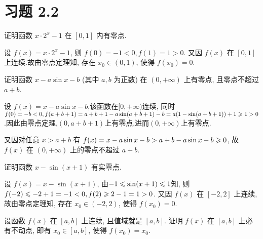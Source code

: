 \section{习题 2.2}

\begin{exercise}[2.2.1]
    证明函数 $x \cdot 2^x - 1$ 在 $[0,1]$ 内有零点.
\end{exercise}

\begin{solution}
    设 $f(x) = x \cdot 2^x - 1$, 则 $f(0) = -1 < 0, f(1) = 1 > 0$. 又因 $f(x)$ 在 $[0,1]$ 上连续.故由零点定理知, 存在 $x_0 \in (0,1)$, 使得 $f(x_0) = 0$.
\end{solution}

\begin{exercise}[2.2.2]
    证明函数 $x - a\sin x - b$ (其中 $a,b$ 为正数) 在 $(0, +\infty)$ 上有零点, 且零点不超过 $a+b$.
\end{exercise}

\begin{solution}
    设 $f(x) = x - a\sin x - b$,该函数在$[0,+\infty)$连续, 同时 $f(0) = -b < 0, f(a+b+1) = a + b + 1 - a\sin(a+b+1) - b = a(1-\sin(a+b+1))+1 \geqslant 1>0$.因此由零点定理,$(0,a+b+1)$上有零点,进而$(0,+\infty)$上有零点.

    又因对任意 $x > a+b$ 有 $f(x) = x - a\sin x - b > a + b - a \sin x - b \geqslant 0$, 故 $f(x)$ 在 $(0, +\infty)$ 上的零点不超过 $a+b$.
\end{solution}

\begin{exercise}[2.2.3]
    证明函数 $x - \sin(x+1)$ 有实零点.
\end{exercise}

\begin{solution}
    设 $f(x) = x - \sin(x+1)$, 由$ -1 \leqslant \sin(x+1) \leqslant 1$知,
    则 $f(-2) \leqslant -2 + 1 = -1 < 0, f(2) \geqslant 2 - 1 = 1 > 0$. 又因 $f(x)$ 在 $[-2,2]$ 上连续, 故由零点定理知, 存在 $x_0 \in (-2,2)$, 使得 $f(x_0) = 0$.
\end{solution}

\begin{exercise}[2.2.4]
    设函数 $f(x)$ 在 $[a,b]$ 上连续, 且值域就是 $[a,b]$. 证明 $f(x)$ 在 $[a,b]$ 上必有不动点, 即有 $x_0 \in [a,b]$, 使得 $f(x_0)=x_0$.
\end{exercise}

